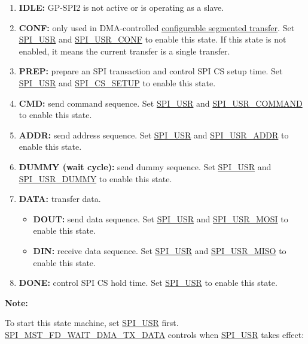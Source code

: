 \documentclass[main\_\_EN.tex]{subfiles}
\begin{document}
\begin{enumerate}
    \item \textbf{IDLE:} GP-SPI2 is not active or is operating as a slave.
    \item \textbf{CONF:} only used in DMA-controlled \hyperref[sec:gp-spi-dma-seg-conf-trans]{configurable segmented transfer}. Set \hyperref[fielddesc:SPIUSR]{SPI\_USR} and \hyperref[fielddesc:SPIUSRCONF]{SPI\_USR\_CONF} to enable this state. If this state is not enabled, it means the current transfer is a single transfer.
    \item \textbf{PREP:} prepare an SPI transaction and control SPI CS setup time. Set \hyperref[fielddesc:SPIUSR]{SPI\_USR} and \hyperref[fielddesc:SPICSSETUP]{SPI\_CS\_SETUP} to enable this state.
    \item\label{phase:cmd} \textbf{CMD:} send command sequence. Set \hyperref[fielddesc:SPIUSR]{SPI\_USR} and \hyperref[fielddesc:SPIUSRCOMMAND]{SPI\_USR\_COMMAND} to enable this state.
    \item\label{phase:addr} \textbf{ADDR:} send address sequence. Set \hyperref[fielddesc:SPIUSR]{SPI\_USR} and \hyperref[fielddesc:SPIUSRADDR]{SPI\_USR\_ADDR} to enable this state.
    \item \textbf{DUMMY (wait cycle):} send dummy sequence. Set \hyperref[fielddesc:SPIUSR]{SPI\_USR} and \hyperref[fielddesc:SPIUSRDUMMY]{SPI\_USR\_DUMMY} to enable this state.
    \item\label{phase:data} \textbf{DATA:} transfer data.
    \begin{itemize}
    \item \textbf{DOUT:} send data sequence. Set \hyperref[fielddesc:SPIUSR]{SPI\_USR} and \hyperref[fielddesc:SPIUSRMOSI]{SPI\_USR\_MOSI} to enable this state.
    \item \textbf{DIN:} receive data sequence. Set \hyperref[fielddesc:SPIUSR]{SPI\_USR} and \hyperref[fielddesc:SPIUSRMISO]{SPI\_USR\_MISO} to enable this state.
    \end{itemize}
    \item \textbf{DONE:} control SPI CS hold time. Set \hyperref[fielddesc:SPIUSR]{SPI\_USR} to enable this state.
\end{enumerate}

\textbf{Note:}

To start this state machine, set \hyperref[fielddesc:SPIUSR]{SPI\_USR} first. \hyperref[fielddesc:SPIMSTFDWAITDMATXDATA]{SPI\_MST\_FD\_WAIT\_DMA\_TX\_DATA} controls when \hyperref[fielddesc:SPIUSR]{SPI\_USR} takes effect:
\end{document}
